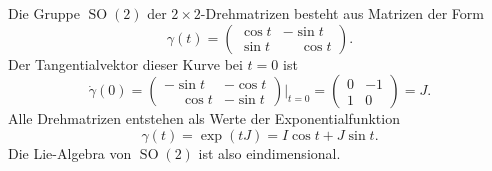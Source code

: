 \begin{beispiel}
Die Gruppe $\operatorname{SO}(2)$ der $2\times 2$-Drehmatrizen
besteht aus Matrizen der Form
\[
\gamma(t)
=
\begin{pmatrix}
\cos t &          -  \sin t \\
\sin t & \phantom{-} \cos t
\end{pmatrix}.
\]
Der Tangentialvektor dieser Kurve bei $t=0$ ist
\[
\dot{\gamma}(0)
=
\begin{pmatrix}
         - \sin t & -\cos t \\
\phantom{-}\cos t & -\sin t
\end{pmatrix}
\bigg|_{t=0}
=
\begin{pmatrix}
0&-1\\
1&0
\end{pmatrix}
=J.
\]
Alle Drehmatrizen entstehen als Werte der Exponentialfunktion
\[
\gamma(t)
=
\exp(tJ)
=
I \cos t + J \sin t.
\]
Die Lie-Algebra von $\operatorname{SO}(2)$ ist also eindimensional.
\end{beispiel}

